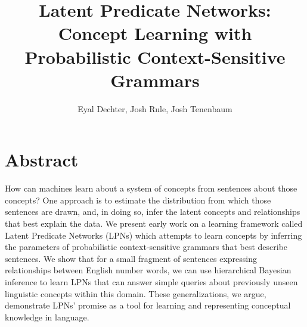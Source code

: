 \documentclass[11pt, twocolumn]{article}
\title{Latent Predicate Networks: Concept Learning with Probabilistic Context-Sensitive Grammars}
\author{Eyal Dechter,  Josh Rule, Josh Tenenbaum}
\begin{document}
\maketitle

\section{Abstract}
How can machines learn about a system of concepts from sentences about
those concepts? One approach is to estimate the distribution from
which those sentences are drawn, and, in doing so, infer the latent
concepts and relationships that best explain the data. We present
early work on a learning framework called Latent Predicate Networks
(LPNs) which attempts to learn concepts by inferring the parameters of
probabilistic context-sensitive grammars that best describe sentences.
We show that for a small fragment of sentences expressing
relationships between English number words, we can use hierarchical
Bayesian inference to learn LPNs that can answer simple queries about
previously unseen linguistic concepts within this domain. These
generalizations, we argue, demonstrate LPNs' promise as a tool for
learning and representing conceptual knowledge in language.
\end{document}
